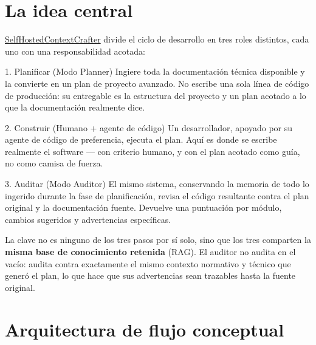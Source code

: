 \documentclass[11pt]{article}
\begin{document}
\section{La idea central}

\href{https://github.com/dramirezbe/SelfHostedContextCrafter}{SelfHostedContextCrafter} divide el ciclo de desarrollo en tres roles distintos, cada uno con una responsabilidad acotada:

\begin{ideabox}{1. Planificar (Modo Planner)}
Ingiere toda la documentación técnica disponible y la convierte en un plan de proyecto avanzado. No escribe una sola línea de código de producción: su entregable es la estructura del proyecto y un plan acotado a lo que la documentación realmente dice.
\end{ideabox}

\vspace{0.4em}

\begin{ideabox}{2. Construir (Humano + agente de código)}
Un desarrollador, apoyado por su agente de código de preferencia, ejecuta el plan. Aquí es donde se escribe realmente el software --- con criterio humano, y con el plan acotado como guía, no como camisa de fuerza.
\end{ideabox}

\vspace{0.4em}

\begin{ideabox}{3. Auditar (Modo Auditor)}
El mismo sistema, conservando la memoria de todo lo ingerido durante la fase de planificación, revisa el código resultante contra el plan original y la documentación fuente. Devuelve una puntuación por módulo, cambios sugeridos y advertencias específicas.
\end{ideabox}

\vspace{0.6em}

La clave no es ninguno de los tres pasos por sí solo, sino que los tres comparten la \textbf{misma base de conocimiento retenida} (RAG). El auditor no audita en el vacío: audita contra exactamente el mismo contexto normativo y técnico que generó el plan, lo que hace que sus advertencias sean trazables hasta la fuente original.

\section{Arquitectura de flujo conceptual}
\end{document}
